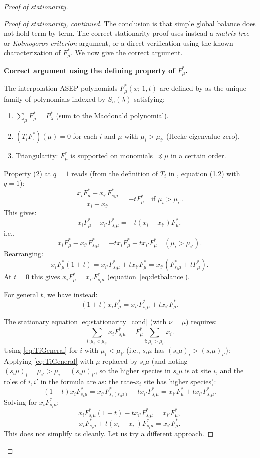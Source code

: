 \documentclass[12pt]{article}
\theoremstyle{definition}
\begin{document}
\begin{proof}[Proof of stationarity]
\begin{proof}[Proof of stationarity, continued]
The conclusion is that simple global balance does not hold term-by-term.  The
correct stationarity proof uses instead a \emph{matrix-tree} or
\emph{Kolmogorov criterion} argument, or a direct verification using the known
characterization of $F^*_\mu$.  We now give the correct argument.

\medskip

\textbf{Correct argument using the defining property of $F^*_\mu$.}

The interpolation ASEP polynomials $F^*_\mu(x;\,1,t)$ are defined by
\cite{CMW22} as the unique family of polynomials indexed by $S_n(\lambda)$
satisfying:
\begin{enumerate}
\item $\sum_\mu F^*_\mu = P^*_\lambda$ (sum to the Macdonald polynomial).
\item $(T_i F^*_\cdot)(\mu) = 0$ for each $i$ and $\mu$ with $\mu_i > \mu_{i'}$
  (Hecke eigenvalue zero).
\item Triangularity: $F^*_\mu$ is supported on monomials $\preceq \mu$ in a
  certain order.
\end{enumerate}

Property (2) at $q=1$ reads (from the definition of $T_i$ in \cite{CMW22},
equation (1.2) with $q=1$):
\[
  \frac{x_i F^*_\mu - x_{i'} F^*_{s_i\mu}}{x_i - x_{i'}}
  = -t F^*_\mu \quad \text{if } \mu_i > \mu_{i'}.
\]
This gives:
\[
  x_i F^*_\mu - x_{i'} F^*_{s_i\mu} = -t(x_i - x_{i'}) F^*_\mu,
\]
i.e.,
\begin{equation}\label{eq:TiHecke}
  x_i F^*_\mu - x_{i'} F^*_{s_i\mu}
  = -t x_i F^*_\mu + t x_{i'} F^*_\mu
  \quad (\mu_i > \mu_{i'}).
\end{equation}
Rearranging:
\[
  x_i F^*_\mu (1 + t) = x_{i'} F^*_{s_i\mu} + t x_{i'} F^*_\mu
  = x_{i'} (F^*_{s_i\mu} + t F^*_\mu).
\]
At $t = 0$ this gives $x_i F^*_\mu = x_{i'} F^*_{s_i\mu}$
(equation~\eqref{eq:detbalance}).

For general $t$, we have instead:
\begin{equation}\label{eq:TiGeneral}
  (1+t) x_i F^*_\mu = x_{i'} F^*_{s_i\mu} + t x_{i'} F^*_\mu.
\end{equation}

The stationary equation \eqref{eq:stationarity_cond} (with $\nu = \mu$) requires:
\[
  \sum_{i: \mu_i < \mu_{i'}} x_i F^*_{s_i\mu}
  = F^*_\mu \sum_{i : \mu_i > \mu_{i'}} x_i.
\]
Using \eqref{eq:TiGeneral} for $i$ with $\mu_i < \mu_{i'}$
(i.e., $s_i\mu$ has $(s_i\mu)_i > (s_i\mu)_{i'}$):
Applying \eqref{eq:TiGeneral} with $\mu$ replaced by $s_i\mu$ (and noting
$(s_i\mu)_i = \mu_{i'} > \mu_i = (s_i\mu)_{i'}$, so the higher species
in $s_i\mu$ is at site $i$, and the roles of $i, i'$ in the formula are
as: the rate-$x_i$ site has higher species):
\[
  (1+t) x_i F^*_{s_i\mu} = x_{i'} F^*_{s_i(s_i\mu)} + t x_{i'} F^*_{s_i\mu}
  = x_{i'} F^*_\mu + t x_{i'} F^*_{s_i\mu}.
\]
Solving for $x_i F^*_{s_i\mu}$:
\[
  x_i F^*_{s_i\mu} (1+t) - t x_{i'} F^*_{s_i\mu} = x_{i'} F^*_\mu,
\]
\[
  x_i F^*_{s_i\mu} + t(x_i - x_{i'}) F^*_{s_i\mu} = x_{i'} F^*_\mu.
\]
This does not simplify as cleanly.  Let us try a different approach.


\end{proof}
\end{proof}
\end{document}
